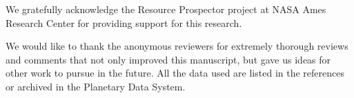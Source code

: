 \documentclass[draft,linenumbers]{agujournal}
\begin{document}
%
%
%
%
%
%
%


\acknowledgments


We gratefully acknowledge the Resource Prospector project at NASA Ames
Research Center for providing support for this research.

We would like to thank the anonymous reviewers for extremely thorough reviews and comments
that not only improved this manuscript, but gave us ideas for other
work to pursue in the future.  All the data used are listed in the
references or archived in the Planetary Data System.










%
%
%
%
%
%
%
%
%
%
\end{document}

